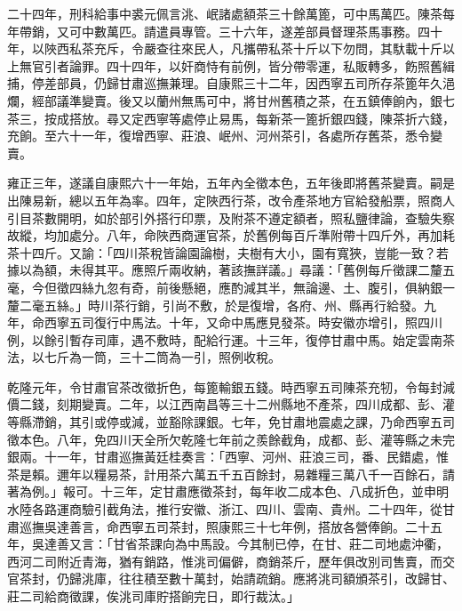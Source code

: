 \begin{pinyinscope}
二十四年，刑科給事中裘元佩言洮、岷諸處額茶三十餘萬篦，可中馬萬匹。陳茶每年帶銷，又可中數萬匹。請遣員專管。三十六年，遂差部員督理茶馬事務。四十年，以陜西私茶充斥，令嚴查往來民人，凡攜帶私茶十斤以下勿問，其馱載十斤以上無官引者論罪。四十四年，以奸商恃有前例，皆分帶零運，私販轉多，飭照舊緝捕，停差部員，仍歸甘肅巡撫兼理。自康熙三十二年，因西寧五司所存茶篦年久浥爛，經部議準變賣。後又以蘭州無馬可中，將甘州舊積之茶，在五鎮俸餉內，銀七茶三，按成搭放。尋又定西寧等處停止易馬，每新茶一篦折銀四錢，陳茶折六錢，充餉。至六十一年，復增西寧、莊浪、岷州、河州茶引，各處所存舊茶，悉令變賣。

雍正三年，遂議自康熙六十一年始，五年內全徵本色，五年後即將舊茶變賣。嗣是出陳易新，總以五年為率。四年，定陜西行茶，改令產茶地方官給發船票，照商人引目茶數開明，如於部引外搭行印票，及附茶不遵定額者，照私鹽律論，查驗失察故縱，均加處分。八年，命陜西商運官茶，於舊例每百斤準附帶十四斤外，再加耗茶十四斤。又諭：「四川茶稅皆論園論樹，夫樹有大小，園有寬狹，豈能一致？若據以為額，未得其平。應照斤兩收納，著該撫詳議。」尋議：「舊例每斤徵課二釐五毫，今但徵四絲九忽有奇，前後懸絕，應酌減其半，無論邊、土、腹引，俱納銀一釐二毫五絲。」時川茶行銷，引尚不敷，於是復增，各府、州、縣再行給發。九年，命西寧五司復行中馬法。十年，又命中馬應見發茶。時安徽亦增引，照四川例，以餘引暫存司庫，遇不敷時，配給行運。十三年，復停甘肅中馬。始定雲南茶法，以七斤為一筒，三十二筒為一引，照例收稅。

乾隆元年，令甘肅官茶改徵折色，每篦輸銀五錢。時西寧五司陳茶充牣，令每封減價二錢，刻期變賣。二年，以江西南昌等三十二州縣地不產茶，四川成都、彭、灌等縣滯銷，其引或停或減，並豁除課銀。七年，免甘肅地震處之課，乃命西寧五司徵本色。八年，免四川天全所欠乾隆七年前之羨餘截角，成都、彭、灌等縣之未完銀兩。十一年，甘肅巡撫黃廷桂奏言：「西寧、河州、莊浪三司，番、民錯處，惟茶是賴。邇年以糧易茶，計用茶六萬五千五百餘封，易雜糧三萬八千一百餘石，請著為例。」報可。十三年，定甘肅應徵茶封，每年收二成本色、八成折色，並申明水陸各路運商驗引截角法，推行安徽、浙江、四川、雲南、貴州。二十四年，從甘肅巡撫吳達善言，命西寧五司茶封，照康熙三十七年例，搭放各營俸餉。二十五年，吳達善又言：「甘省茶課向為中馬設。今其制已停，在甘、莊二司地處沖衢，西河二司附近青海，猶有銷路，惟洮司偏僻，商銷茶斤，歷年俱改別司售賣，而交官茶封，仍歸洮庫，往往積至數十萬封，始請疏銷。應將洮司額頒茶引，改歸甘、莊二司給商徵課，俟洮司庫貯搭餉完日，即行裁汰。」


\end{pinyinscope}
